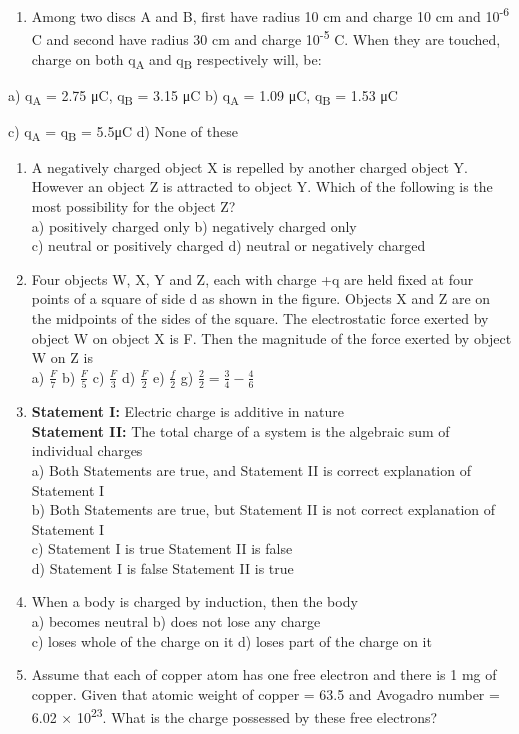 \begin{enumerate}
\def\labelenumi{\arabic{enumi}.}
\item
  Among two discs A and B, first have radius 10 cm and charge 10 cm and
  10\textsuperscript{-6} C and second have radius 30 cm and charge
  10\textsuperscript{-5} C. When they are touched, charge on both
  q\textsubscript{A} and q\textsubscript{B} respectively will, be:
\end{enumerate}

a) q\textsubscript{A} = 2.75 μC, q\textsubscript{B} = 3.15 μC b)
q\textsubscript{A} = 1.09 μC, q\textsubscript{B} = 1.53 μC

c) q\textsubscript{A} = q\textsubscript{B} = 5.5μC d) None of these

\begin{enumerate}
\def\labelenumi{\arabic{enumi}.}
\setcounter{enumi}{1}
\item
  A negatively charged object X is repelled by another charged object Y.
  However an object Z is attracted to object Y. Which of the following
  is the most possibility for the object Z?\\
  a) positively charged only b) negatively charged only\\
  c) neutral or positively charged d) neutral or negatively charged
\item
  Four objects W, X, Y and Z, each with charge +q are held fixed at four
  points of a square of side d as shown in the figure. Objects X and Z
  are on the midpoints of the sides of the square. The electrostatic
  force exerted by object W on object X is F. Then the magnitude of the
  force exerted by object W on Z is\\
  a) \(\frac{F}{7}\) b) \(\frac{F}{5}\) c) \(\frac{F}{3}\) d)
  \(\frac{F}{2}\) e) \(\frac{f}{2}\) g)
  \(\frac{2}{2} = \frac{3}{4} - \frac{4}{6}\)
\item
  \textbf{Statement I:} Electric charge is additive in nature\\
  \textbf{Statement II:} The total charge of a system is the algebraic
  sum of individual charges\\
  a) Both Statements are true, and Statement II is correct explanation
  of Statement I\\
  b) Both Statements are true, but Statement II is not correct
  explanation of Statement I\\
  c) Statement I is true Statement II is false\\
  d) Statement I is false Statement II is true
\item
  When a body is charged by induction, then the body\\
  a) becomes neutral b) does not lose any charge\\
  c) loses whole of the charge on it d) loses part of the charge on it
\item
  Assume that each of copper atom has one free electron and there is 1
  mg of copper. Given that atomic weight of copper = 63.5 and Avogadro
  number = 6.02 × 10\textsuperscript{23}. What is the charge possessed
  by these free electrons?
\end{enumerate}

